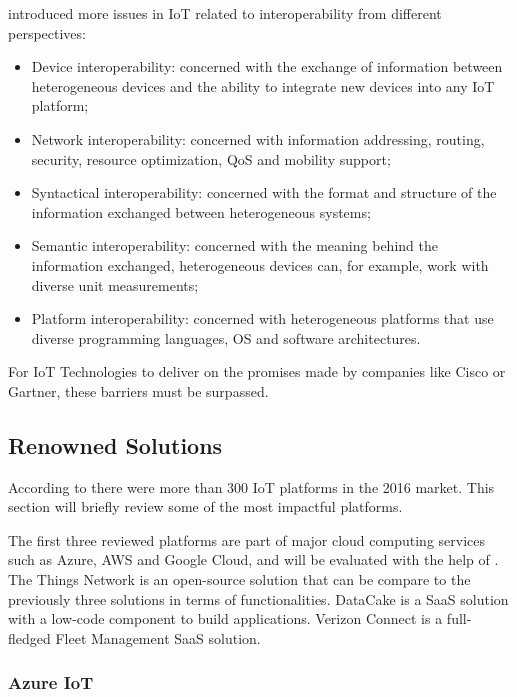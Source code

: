 \cite{noura2019interoperability} introduced more issues in \gls{IoT} related to interoperability from different perspectives:

\begin{itemize}
    \item Device interoperability: concerned with the exchange of information between heterogeneous devices and the ability to integrate new devices into any \gls{IoT} platform;
    \item Network interoperability: concerned with information addressing, routing, security, resource optimization, \gls{QoS} and mobility support;
    \item Syntactical interoperability: concerned with the format and structure of the information exchanged between heterogeneous systems;
    \item Semantic interoperability: concerned with the meaning behind the information exchanged, heterogeneous devices can, for example, work with diverse unit measurements;
    \item Platform interoperability: concerned with heterogeneous platforms that use diverse programming languages, \gls{OS} and software architectures.
\end{itemize}

For \gls{IoT} Technologies to deliver on the promises made by companies like Cisco or Gartner, these barriers must be surpassed.

\subsection{Renowned Solutions}
\label{subsec:stateofart:iot:solutions}

According to \cite{iot-platforms} there were more than 300 \gls{IoT} platforms in the 2016 market. This section will briefly review some of the most impactful platforms.

The first three reviewed platforms are part of major cloud computing services such as Azure, AWS and Google Cloud, and will be evaluated with the help of \cite{pierleoni2019amazon}.
The Things Network is an open-source solution that can be compare to the previously three solutions in terms of functionalities.
DataCake is a \gls{SaaS} solution with a low-code component to build applications.
Verizon Connect is a full-fledged Fleet Management \gls{SaaS} solution.

\subsubsection{Azure IoT}
\label{subsubsec:stateofart:iot:solutions:azure}

